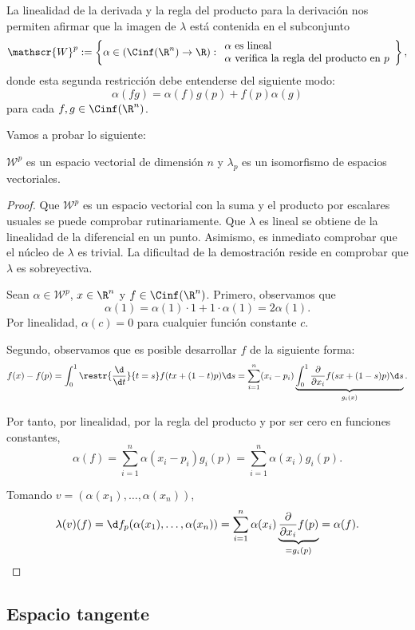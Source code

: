 La linealidad de la derivada y la regla del producto para la derivación nos
permiten afirmar que la imagen de $\lambda$ está contenida en el subconjunto
\[
  \mathscr{W}^{p} := \left\{ \alpha\in(\Cinf(\R^{n})\to\R) :
    \begin{array}{l}
      \alpha\text{ es lineal} \\
      \alpha\text{ verifica la regla del producto en $p$}
    \end{array}
\right\}
,\]
donde esta segunda restricción debe entenderse del siguiente modo:
\[
  \alpha(fg) = \alpha(f)g(p) + f(p)\alpha(g)
\]
para cada $f,g\in\Cinf(\R^{n})$.

Vamos a probar lo siguiente:
\begin{nth}
  $\mathscr{W}^{p}$ es un espacio vectorial de dimensión $n$ y $\lambda_{p}$ es un
  isomorfismo de espacios vectoriales.
\end{nth}
\begin{proof}
  Que $\mathscr{W}^{p}$ es un espacio vectorial con la suma y el producto por
  escalares usuales se puede comprobar rutinariamente. Que $\lambda$ es lineal
  se obtiene de la linealidad de la diferencial en un punto. Asimismo, es
  inmediato comprobar que el núcleo de $\lambda$ es trivial. La dificultad de la
  demostración reside en comprobar que $\lambda$ es sobreyectiva.

  Sean $\alpha\in \mathscr{W}^{p}$, $x\in \R^{n}$ y
  $f\in\Cinf(\R^{n})$. Primero, observamos que
  \[
    \alpha(1) = \alpha(1)\cdot 1 + 1\cdot\alpha(1) = 2\alpha(1)
  .\]
  Por linealidad, $\alpha(c) = 0$ para cualquier función constante $c$.

  Segundo, observamos que es posible desarrollar $f$ de la siguiente forma:
  \[
    f(x)-f(p) = \int_{0}^{1} \restr{\frac{\d}{\d t}}{t = s}f(tx+(1-t)p)\d s =
    \sum_{i=1}^{n}(x_{i}-p_{i})\underbrace{\int_{0}^{1}\frac{\partial}{\partial
        x_{i}}f(sx + (1-s)p)\d s}_{g_{i}(x)}
  .\]

Por tanto, por linealidad, por la regla del producto y por ser cero en funciones
constantes,
\[
  \alpha(f) = \sum_{i=1}^{n} \alpha(x_{i}-p_{i})g_{i}(p) = \sum_{i=1}^{n} \alpha(x_{i})g_{i}(p)
.\]

Tomando $v = (\alpha(x_{1}), \dots, \alpha(x_{n}))$,
\[
  \lambda(v)(f) = \d f_{p}(\alpha(x_{1}),\dots,\alpha(x_{n})) = \sum_{i=1}^{n}
  \alpha(x_{i})\underbrace{\frac{\partial}{\partial x_{i}}f(p)}_{=g_{i}(p)} = \alpha(f)
.\]
\end{proof}

\subsection{Espacio tangente}


